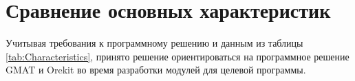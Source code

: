\section{Сравнение основных характеристик}
\begin{table}[ht]
\centering
{}\caption{Характеристики существующих решений}
\label{tab:Characteristics}
\end{table}\par
    Учитывая требования к программному решению и данным из таблицы \ref{tab:Characteristics},
принято решение ориентироваться на программное решение GMAT и Orekit во время
разработки модулей для целевой программы.
